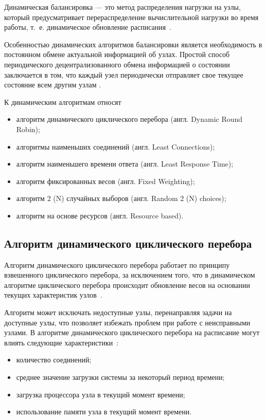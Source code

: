 Динамическая балансировка --- это метод распределения нагрузки на узлы, который предусматривает перераспределение вычислительной нагрузки во время работы, т.~е. динамическое обновление расписания~\cite{intuit}.
 

Особенностью динамических алгоритмов балансировки является необходимость в постоянном обмене актуальной информацией об узлах.
Простой способ периодического децентрализованного обмена информацией о состоянии заключается в том, что каждый узел периодически отправляет свое текущее состояние всем другим узлам \cite{drr}.

К динамическим алгоритмам относят~\cite{drr, dll_warsh, mainsource}
\begin{itemize}
	\item алгоритм динамического циклического перебора (англ. Dynamic Round Robin);
	\item алгоритмы наименьших соединений (англ. Least Connections);
	\item алгоритм наименьшего времени ответа (англ. Least Response Time);
    \item алгоритм фиксированных весов (англ. Fixed Weighting);
	\item алгоритм 2 (N) случайных выборов (англ. Random 2 (N) choices);
	\item алгоритм на основе ресурсов (англ. Resource based).
\end{itemize}


\subsection{Алгоритм динамического циклического перебора}

Алгоритм динамического циклического перебора работает по принципу взвешенного циклического перебора, за исключением того, что 
в динамическом алгоритме циклического перебора происходит обновление весов на основании текущих характеристик узлов~\cite{drr, nginx}.

Алгоритм может исключать недоступные узлы, перенаправляя задачи на доступные узлы, что позволяет избежать проблем при работе с неисправными узлами. 
В алгоритме динамического циклического перебора на расписание могут влиять следующие характеристики~\cite{dll_warsh, com_analysis, part_algos}: 
\begin{itemize}
	\item количество соединений;
	\item среднее значение загрузки системы за некоторый период времени;
	\item загрузка процессора узла в текущий момент времени;
	\item использование памяти узла в текущий момент времени.
\end{itemize}

